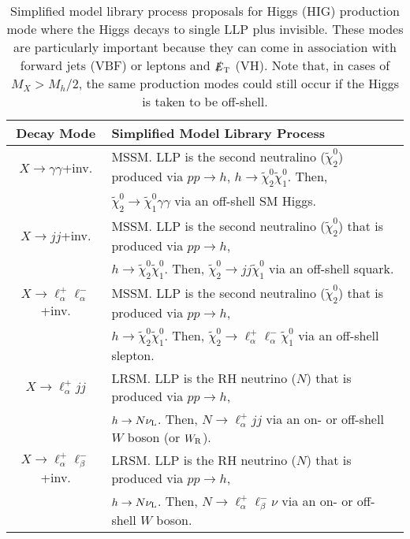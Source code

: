 \begin{table}
\begin{center}
\begin{tabular}{ |c|l|} 
 \hline
Decay Mode & Simplified Model Library Process \\
\hline\hline
$X\rightarrow \gamma\gamma$+inv. & MSSM. LLP is the second neutralino  ($\tilde\chi_2^0$)   produced via $pp\rightarrow h$, $h\rightarrow\tilde\chi_2^0\tilde\chi_1^0$.  Then,  \\
&    $\tilde\chi_2^0\rightarrow\tilde\chi_1^0\gamma\gamma$ via an off-shell SM Higgs. \\
\hline
$X\rightarrow jj$+inv.& MSSM. LLP is the second neutralino ($\tilde\chi_2^0$) that is produced via $pp\rightarrow h $,  \\
& $h\rightarrow \tilde\chi_2^0\tilde\chi_1^0$. Then, $\tilde\chi_2^0\rightarrow jj\tilde\chi_1^0$  via an  off-shell  squark.\\
\hline
$X\rightarrow \ell_\alpha^+\ell_\alpha^-$+inv. & MSSM. LLP is the second neutralino ($\tilde\chi_2^0$) that is produced via $pp\rightarrow h $,  \\
& $h\rightarrow \tilde\chi_2^0\tilde\chi_1^0$.  Then, $\tilde\chi_2^0\rightarrow \ell_\alpha^+\ell_\alpha^-\tilde\chi_1^0$  via an  off-shell  slepton.\\

\hline
$X\rightarrow \ell_\alpha^+jj$ & LRSM. LLP is the RH neutrino ($N$) that is produced via $pp\rightarrow h $,  \\
& $h\rightarrow N\nu_{\rm L}$.  Then, $N\rightarrow \ell_\alpha^+jj$  via an on- or  off-shell  $W$ boson (or $W_{\rm R}$).\\

\hline
$X\rightarrow \ell_\alpha^+\ell_\beta^-$+inv. & LRSM. LLP is the RH neutrino ($N$) that is produced via $pp\rightarrow h $,  \\
& $h\rightarrow N\nu_{\rm L}$.  Then, $N\rightarrow \ell_\alpha^+\ell_\beta^-\nu$  via an on- or  off-shell  $W$ boson.\\

\hline
\end{tabular}
\end{center}
\caption{Simplified model library process proposals for Higgs (HIG) production mode where the Higgs decays to single LLP plus invisible. These modes are particularly important because they can come in association with forward jets (VBF) or leptons and $\slashed{E}_{\rm T}$ (VH). Note that, in cases of $M_X>M_h/2$, the same production modes could still occur if the Higgs is taken to be off-shell. }\label{tab:Higgs_single_neutral_library}
\end{table}

